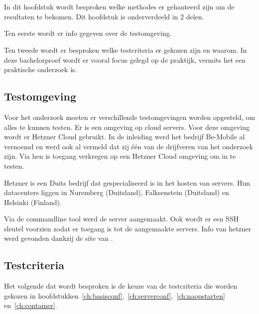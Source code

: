 
\chapter{}
\label{ch:methodologie}

In dit hoofdstuk wordt besproken welke methodes er gehanteerd zijn om de resultaten te bekomen. Dit hoofdstuk is onderverdeeld in 2 delen. 

Ten eerste wordt er info gegeven over de testomgeving. 

Ten tweede wordt er besproken welke testcriteria er gekozen zijn en waarom. In deze bachelorproef wordt er vooral focus gelegd op de praktijk, vermits het een praktische onderzoek is.

\section{Testomgeving}
Voor het onderzoek moeten er verschillende testomgevingen worden opgesteld, om alles te kunnen testen. Er is een omgeving op cloud servers. Voor deze omgeving wordt er Hetzner Cloud gebruikt. In de inleiding werd het bedrijf Be-Mobile al vernoemd en werd ook al vermeld dat zij één van de drijfveren van het onderzoek zijn. Via hen is toegang verkregen op een Hetzner Cloud omgeving om in te testen. 

Hetzner is een Duits bedrijf dat gespecialiseerd is in het hosten van servers. Hun datacenters liggen in Nuremberg (Duitsland), Falksenstein (Duitsland) en Helsinki (Finland). 

Via de commandline tool werd de server aangemaakt. Ook wordt er een SSH sleutel voorzien zodat er toegang is tot de aangemaakte servers. Info van hetzner werd gevonden dankzij de site van \autocite{hetzner}.

\section{Testcriteria}
Het volgende dat wordt besproken is de keuze van de testcriteria die worden gekozen in hoofdstukken~\ref{ch:basisconf},~\ref{ch:serverconf},~\ref{ch:naopstarten} en~\ref{ch:container}. 

